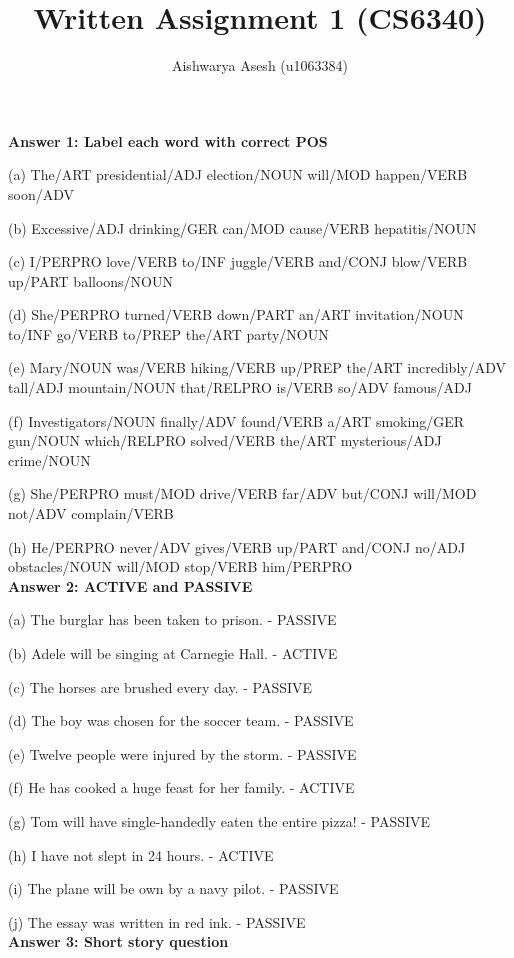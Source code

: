 \documentclass{article}
\begin{document}
\title{Written Assignment 1 (CS6340)}
\author{Aishwarya Asesh (u1063384)}
\maketitle
\raggedright

\textbf {Answer 1: Label each word with correct POS}

(a) The/ART presidential/ADJ election/NOUN will/MOD happen/VERB soon/ADV

(b) Excessive/ADJ drinking/GER can/MOD cause/VERB hepatitis/NOUN

(c) I/PERPRO love/VERB to/INF juggle/VERB and/CONJ blow/VERB up/PART balloons/NOUN

(d) She/PERPRO turned/VERB down/PART an/ART invitation/NOUN to/INF go/VERB to/PREP the/ART party/NOUN

(e) Mary/NOUN was/VERB hiking/VERB up/PREP the/ART incredibly/ADV tall/ADJ mountain/NOUN that/RELPRO is/VERB so/ADV famous/ADJ

(f) Investigators/NOUN finally/ADV found/VERB a/ART smoking/GER gun/NOUN which/RELPRO solved/VERB the/ART mysterious/ADJ crime/NOUN

(g) She/PERPRO must/MOD drive/VERB far/ADV but/CONJ will/MOD not/ADV complain/VERB

(h) He/PERPRO never/ADV gives/VERB up/PART and/CONJ no/ADJ obstacles/NOUN will/MOD stop/VERB him/PERPRO
\\[10pt]
\textbf {Answer 2: ACTIVE and PASSIVE}

(a) The burglar has been taken to prison. - PASSIVE

(b) Adele will be singing at Carnegie Hall. - ACTIVE

(c) The horses are brushed every day. - PASSIVE

(d) The boy was chosen for the soccer team. - PASSIVE

(e) Twelve people were injured by the storm. - PASSIVE

(f) He has cooked a huge feast for her family. - ACTIVE

(g) Tom will have single-handedly eaten the entire pizza! - PASSIVE

(h) I have not slept in 24 hours. - ACTIVE

(i) The plane will be own by a navy pilot. - PASSIVE

(j) The essay was written in red ink. - PASSIVE
\\[10pt]
\textbf {Answer 3: Short story question}
\end{document}
